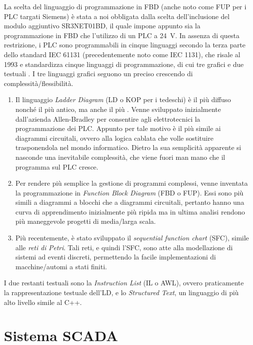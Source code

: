 La scelta del linguaggio di programmazione in FBD (anche noto come FUP per i PLC targati Siemens) è
stata a noi obbligata dalla scelta dell'inclusione del modulo aggiuntivo SR3NET01BD, il quale impone
appunto sia la programmazione in FBD che l'utilizzo di un PLC a \qty{24}{\volt}. In assenza di
questa restrizione, i PLC sono programmabili in cinque linguaggi secondo la terza parte dello
standard IEC 61131 (precedentemente noto come IEC 1131), che risale al 1993 e standardizza cinque
linguaggi di programmazione, di cui tre grafici e due testuali \cite{lewis_1998}. I tre linguaggi
grafici seguono un preciso crescendo di complessità/flessibilità.
\begin{enumerate}
    \item Il linguaggio \emph{Ladder Diagram} (LD o KOP per i tedeschi) è il più diffuso nonché il
        più antico, ma anche il più . Venne sviluppato inizialmente dall'azienda
        Allen-Bradley per consentire agli elettrotecnici la programmazione dei PLC. Appunto per tale
        motivo è il più simile ai diagrammi circuitali, ovvero alla logica cablata che volle
        sostituire trasponendola nel mondo informatico. Dietro la sua semplicità apparente si
        nasconde una inevitabile complessità, che viene fuori man mano che il programma sul PLC
        cresce.
    \item Per rendere più semplice la gestione di programmi complessi, venne inventata la
        programmazione in \emph{Function Block Diagram} (FBD o FUP). Essi sono più simili a
        diagrammi a blocchi che a diagrammi circuitali, pertanto hanno una curva di apprendimento
        inizialmente più ripida ma in ultima analisi rendono più maneggevole progetti di media/larga
        scala.
    \item Più recentemente, è stato sviluppato il \emph{sequential function chart} (SFC), simile
        alle \emph{reti di Petri}. Tali reti, e quindi l'SFC, sono atte alla modellazione di sistemi
        ad eventi discreti, permettendo la facile implementazioni di macchine/automi a stati finiti.
\end{enumerate}
I due restanti testuali sono la \emph{Instruction List} (IL o AWL), ovvero praticamente la
rappresentazione testuale dell'LD, e lo \emph{Structured Text}, un linguaggio di più alto livello
simile al C++.

\section{Sistema SCADA}

